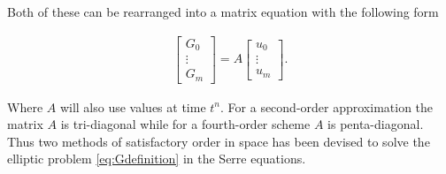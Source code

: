 \documentclass[SingleSpace,12pt]{Serre_ASCE}
\begin{document}
Both of these can be rearranged into a matrix equation with the following form 
\begin{linenomath*}
\begin{gather*}
\left[\begin{array}{c}
 G_0 \\
 \vdots \\
 G_m \end{array}\right]
 = A \left[\begin{array}{c}
  u_0 \\
  \vdots \\
  u_m \end{array}\right].
\end{gather*}
\end{linenomath*}
Where $A$ will also use values at time $t^n$. For a second-order approximation the matrix $A$ is tri-diagonal while for a fourth-order scheme $A$ is penta-diagonal. Thus two methods of satisfactory order in space has been devised to solve the elliptic problem \eqref{eq:Gdefinition} in the Serre equations.
\end{document}
